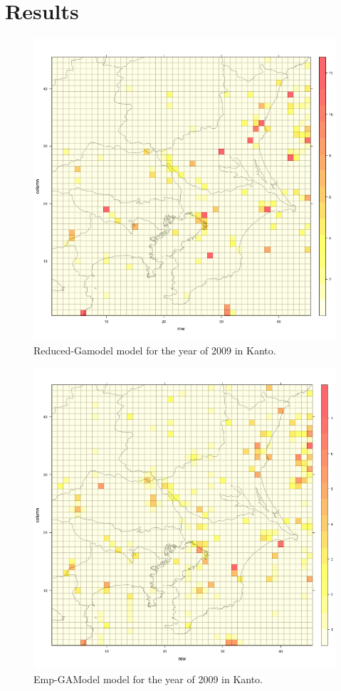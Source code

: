 \section{Results}\label{Results}

\begin{figure}[!htb]
\centering
\includegraphics[scale=0.2]{img/NPKanto_2009.png}
\caption{Reduced-Gamodel model for the year of 2009 in Kanto.}
\label{listas-NPKanto_2009.png}
\end{figure}

\begin{figure}[!htb]
\centering
\includegraphics[scale=0.2]{img/modelo_HybridKanto_2009.png}
\caption{Emp-GAModel model for the year of 2009 in Kanto.}
\label{gamodelHybridKanto_2009.png}
\end{figure}

